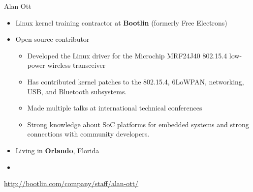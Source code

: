 \begin{frame}{Alan Ott}
    \begin{itemize}
      \item Linux kernel training contractor at {\bf Bootlin} (formerly
            Free Electrons)
      \item Open-source contributor
        \begin{itemize}
	  \item Developed the Linux driver for the Microchip MRF24J40 802.15.4
		low-power wireless transceiver
	  \item Has contributed kernel patches to the 802.15.4, 6LoWPAN,
		networking, USB, and Bluetooth subsystems.
	  \item Made multiple talks at international technical conferences
	  \item Strong knowledge about SoC platforms for embedded
		systems and strong connections with community developers.
        \end{itemize}
      \item Living in {\bf Orlando}, Florida
      \item {}
    \end{itemize}
    {\small \url{http://bootlin.com/company/staff/alan-ott/}}
\end{frame}

